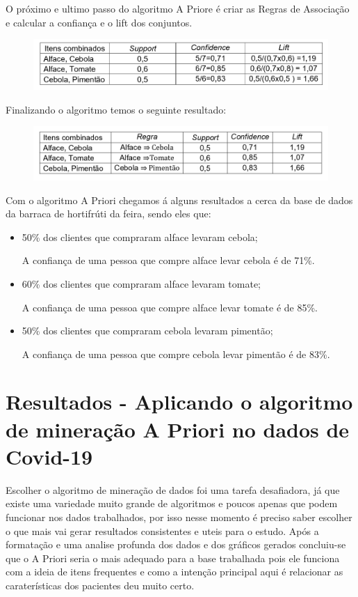 \documentclass[tcc1]{uftex}
\begin{document}
O próximo e ultimo passo do algoritmo A Priore é criar as Regras de Associação e calcular a confiança e o lift dos conjuntos. 
    \begin{figure}[!h]
    \centering
    \includegraphics[width=13cm]{final_1.jpg}
    \end{figure}

Finalizando o algoritmo temos o seguinte resultado:
    \begin{figure}[!h]
    \centering
    \includegraphics[width=13cm]{final_2.jpg}
    \end{figure}

Com o algoritmo A Priori chegamos á alguns resultados a cerca da base de dados da barraca de hortifrúti da feira, sendo eles que:
 \begin{itemize}
   \item 50\% dos clientes que compraram alface levaram cebola;
   
   A confiança de uma pessoa que compre alface levar cebola é de 71\%.
   \item 60\% dos clientes que compraram alface levaram tomate;
   
   A confiança de uma pessoa que compre alface levar tomate é de 85\%.
   \item 50\% dos clientes que compraram cebola levaram pimentão;
   
   A confiança de uma pessoa que compre cebola levar pimentão é de 83\%.
 \end{itemize}

\chapter{Resultados - Aplicando o algoritmo de mineração A Priori no dados de Covid-19}

 Escolher o algoritmo de mineração de dados foi uma tarefa desafiadora, já que existe uma variedade muito grande de algoritmos e poucos apenas que podem funcionar nos dados trabalhados, por isso nesse momento é preciso saber escolher o que mais vai gerar resultados consistentes e uteis para o estudo. Após a formatação e uma analise profunda dos dados e dos gráficos gerados concluiu-se que o A Priori seria o mais adequado para a base trabalhada pois ele funciona com a ideia de itens frequentes e como a intenção principal aqui é relacionar as caraterísticas dos pacientes deu muito certo. 
 
\end{document}
